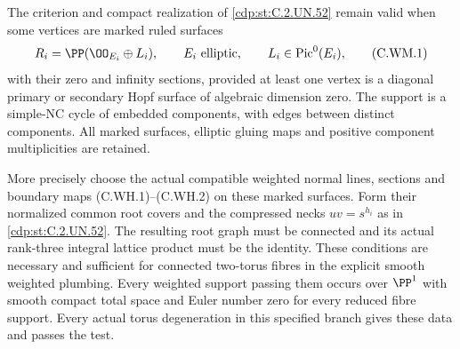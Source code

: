 \begin{proposition}\label{cdp:st:C.2.UN.56}

The criterion and compact realization of \ref{cdp:st:C.2.UN.52}
remain valid when some vertices are marked ruled surfaces
\[
        R_i=\PP(\OO_{E_i}\oplus L_i),\qquad
        E_i\ \hbox{elliptic},\qquad L_i\in\operatorname{Pic}^0(E_i),
\tag{C.WM.1}\label{cdp:eq:C.WM.1}
\]
with their zero and infinity sections, provided at least
one vertex is a diagonal primary or secondary Hopf surface
of algebraic dimension zero. The support is a simple-NC
cycle of embedded components, with edges between distinct
components. All marked surfaces, elliptic gluing maps and
positive component multiplicities are retained.

More precisely choose the actual compatible weighted normal
lines, sections and boundary maps (C.WH.1)--(C.WH.2) on
these marked surfaces. Form their normalized common root
covers and the compressed necks $uv=s^{h_i}$ as in \ref{cdp:st:C.2.UN.52}.
The resulting root graph must be connected and its actual
rank-three integral lattice product must be the identity.
These conditions are necessary and sufficient for connected
two-torus fibres in the explicit smooth weighted plumbing.
Every weighted support passing them occurs over $\PP^1$
with smooth compact total space and Euler number zero for
every reduced fibre support. Every actual torus degeneration
in this specified branch gives these data and passes the test.


\end{proposition}

